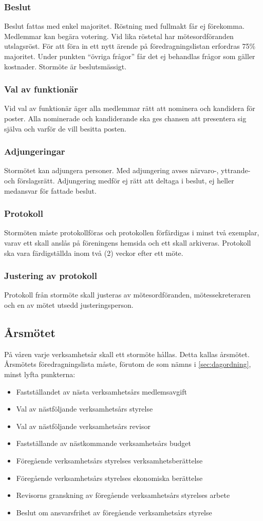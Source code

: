 \documentclass[11pt,a4paper]{article}
\begin{document}
\subsubsection{Beslut}
Beslut fattas med enkel majoritet. Röstning med fullmakt får ej förekomma. Medlemmar kan begära votering. Vid lika röstetal har mötesordföranden utslagsröst. För att föra in ett nytt ärende på föredragningslistan erfordras 75\% majoritet. Under punkten  ``övriga frågor'' får det ej behandlas frågor som gäller kostnader. Stormöte är beslutsmässigt.
\subsubsection{Val av funktionär}
Vid val av funktionär äger alla medlemmar rätt att nominera och kandidera för poster. Alla nominerade och kandiderande ska ges chansen att presentera sig själva och varför de vill besitta posten.
\subsubsection{Adjungeringar}\label{sec:adjungering}
Stormötet kan adjungera personer. Med adjungering avses närvaro-, yttrande- och förslagsrätt. Adjungering medför ej rätt att deltaga i beslut, ej heller medansvar för fattade beslut.

\subsubsection{Protokoll}
Stormöten måste protokollföras och protokollen förfärdigas i minst två exemplar, varav ett skall anslås på föreningens hemsida och ett skall arkiveras. Protokoll ska vara färdigställda inom två (2) veckor efter ett möte.
\subsubsection{Justering av protokoll}
Protokoll från stormöte skall justeras av mötesordföranden, mötessekreteraren och en av mötet utsedd justeringsperson.
\subsection{Årsmötet}
På våren varje verksamhetsår skall ett stormöte hållas. Detta kallas årsmötet. Årsmötets föredragningslista måste, förutom de som nämns i \ref{sec:dagordning}, minst lyfta punkterna:
\begin{itemize}
	\item Fastställandet av nästa verksamhetsårs medlemsavgift
	\item Val av nästföljande verksamhetsårs styrelse
	\item Val av nästföljande verksamhetsårs revisor
	\item Fastställande av nästkommande verksamhetsårs budget
	\item Föregående verksamhetsårs styrelses verksamhetsberättelse
	\item Föregående verksamhetsårs styrelses ekonomiska berättelse
	\item Revisorns granskning av föregående verksamhetsårs styrelses arbete
	\item Beslut om ansvarsfrihet av föregående verksamhetsårs styrelse
\end{itemize}
\end{document}
